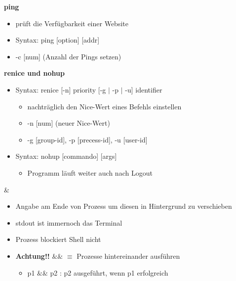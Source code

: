 \documentclass[12pt,utf8, 10pt]{article}
\begin{document}
\textbf{ping}
\begin{itemize}
	\item prüft die Verfügbarkeit einer Website
	\item Syntax: ping [option] [addr] 
	\item -c [num] (Anzahl der Pings setzen)
\end{itemize}

\textbf{renice und nohup}
\begin{itemize}
	\item Syntax: renice [-n] priority [-g $\mid$ -p $\mid$ -u] identifier
	\begin{itemize}
		\item nachträglich den Nice-Wert eines Befehls einstellen
		\item -n [num] (neuer Nice-Wert)
		\item -g [group-id], -p [precess-id], -u [user-id]
	\end{itemize}
	\item Syntax: nohup [commando] [args]
	\begin{itemize}
		\item Programm läuft weiter auch nach Logout
	\end{itemize}
\end{itemize}

\textbf{$\&$}
\begin{itemize}
	\item Angabe am Ende von Prozess um diesen in Hintergrund zu verschieben
	\item stdout ist immernoch das Terminal
	\item Prozess blockiert Shell nicht
	\item \textbf{Achtung!!} $\&\&$ $\equiv$ Prozesse hintereinander ausführen
	\begin{itemize}
		\item p1 $\&\&$ p2 : p2 ausgeführt, wenn p1 erfolgreich
	\end{itemize}
\end{itemize}
\end{document}
